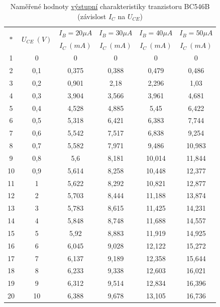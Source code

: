 \documentclass[a4paper, czech]{article}
\begin{document}
\begin{table}[H]
    \centering
    \begin{tabular}{cccccc}
        \toprule
        \multirow{2}{*}{$*$} & \multirow{2}{*}{$U_{CE}\ (V)$} & $I_B = 20 \mu A$ & $I_B = 30 \mu A$ & $I_B = 40 \mu A$ & $I_B = 50 \mu A$ \\
         &  & $I_C\ (mA)$ & $I_C\ (mA)$ & $I_C\ (mA)$ & $I_C\ (mA)$ \\
        \midrule
        1  & 0   & 0     & 0     & 0      & 0      \\
        2  & 0,1 & 0,375 & 0,388 & 0,479  & 0,486  \\
        3  & 0,2 & 0,901 & 2,18  & 2,296  & 1,03   \\
        4  & 0,3 & 3,904 & 3,566 & 3,961  & 4,681  \\
        5  & 0,4 & 4,528 & 4,885 & 5,45   & 6,422  \\
        6  & 0,5 & 5,318 & 6,421 & 6,383  & 7,744  \\
        7  & 0,6 & 5,542 & 7,517 & 6,838  & 9,254  \\
        8  & 0,7 & 5,582 & 7,971 & 9,486  & 10,983 \\
        9  & 0,8 & 5,6   & 8,181 & 10,014 & 11,844 \\
        10 & 0,9 & 5,614 & 8,258 & 10,448 & 12,377 \\
        11 & 1   & 5,622 & 8,292 & 10,821 & 12,877 \\
        12 & 2   & 5,703 & 8,444 & 11,188 & 13,874 \\
        13 & 3   & 5,783 & 8,615 & 11,425 & 14,231 \\
        14 & 4   & 5,848 & 8,748 & 11,688 & 14,557 \\
        \rowcolor{yellow}
        15 & 5   & 5,92  & 8,883 & 11,919 & 14,925 \\
        16 & 6   & 6,045 & 9,028 & 12,122 & 15,272 \\
        17 & 7   & 6,137 & 9,189 & 12,358 & 15,644 \\
        18 & 8   & 6,233 & 9,338 & 12,603 & 16,021 \\
        19 & 9   & 6,312 & 9,514 & 12,834 & 16,396 \\
        20 & 10  & 6,388 & 9,678 & 13,105 & 16,736 \\
        \bottomrule
    \end{tabular}
    \caption{Naměřené hodnoty \underline{výstupní} charakteristiky tranzistoru BC546B (závislost $I_C$ na $U_{CE}$)}
    \label{tab:1}
\end{table}
\end{document}
